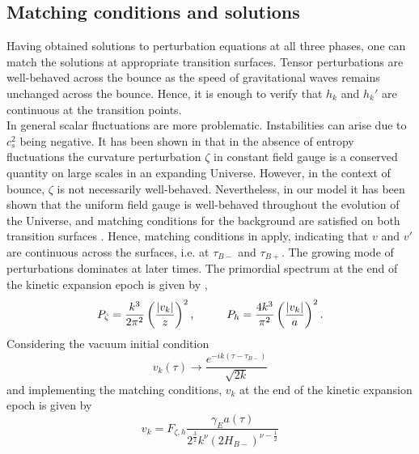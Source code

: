 \documentclass[12pt,a4paper]{article}
\numberwithin{equation}{section}
\numberwithin{equation}{section}
\begin{document}
\subsection{Matching conditions and solutions}
Having obtained solutions to perturbation equations at all three phases, one can match the solutions at appropriate transition surfaces. Tensor perturbations are well-behaved across the bounce as the speed of gravitational waves remains unchanged across the bounce. Hence, it is enough to verify that $h_k$ and $h_k'$ are continuous at the transition points.\\
In general scalar fluctuations are more problematic. Instabilities can arise due to $c_s^2$ being negative.
It has been shown in \cite{PhysRevD.28.679,Brandenberger:1983tg} that in the absence of entropy fluctuations the curvature perturbation $\zeta$ in constant field gauge is a conserved quantity on large scales in an expanding Universe. However, in the context of bounce,  $\zeta$ is not necessarily well-behaved. Nevertheless, in our model it has been shown that the uniform field gauge is well-behaved throughout the evolution of the Universe, and matching conditions for the background are satisfied on both transition surfaces \cite{Cai:2012va}. Hence, matching conditions in \cite{Hwang:1991an,Deruelle:1995kd} apply, indicating that $v$ and $v'$ are continuous across the surfaces, i.e. at $\tau_{B-}$ and $\tau_{B+}$. The growing mode of perturbations dominates at later times.
The primordial spectrum at the end of the kinetic expansion epoch is given by \cite{Cai:2012va},
\begin{equation}
    P_{\zeta} = \frac{k^3}{2\pi^2} \left( \frac{\abs{v_{k}}}{z} \right)^2, \;\;\;\;\;\;\;\;\;\; P_{h} = \frac{4k^3}{\pi^2} \left(\frac{\abs{v_{k}}}{a} \right)^2.
\end{equation}
Considering the vacuum initial condition
\begin{equation}
    v_k(\tau) \longrightarrow \frac{e^{-i k (\tau-\tau_{B-})}}{\sqrt{2k}}
\end{equation}
and implementing the matching conditions, $v_k$ at the end of the kinetic expansion epoch is given by \cite{Cai:2012va}
\begin{equation}
   v_{k} = F_{\zeta,h}  \frac{\gamma_{E} a(\tau)}{2^{\frac{3}{2}}k^{\nu}(2H_{B-})^{\nu-\frac{1}{2}}}
\end{equation}
\end{document}
